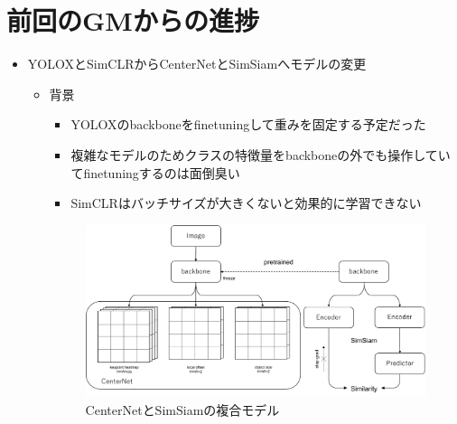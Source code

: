 \documentclass[a4j]{ujarticle}
\begin{document}
\clearpage

    \section{前回のGMからの進捗}
        \begin{itemize}
            \item YOLOX\cite{yolox}とSimCLR\cite{simclr}からCenterNet\cite{centernet}とSimSiam\cite{simsiam}へモデルの変更
            \begin{itemize}
                \item 背景
                \begin{itemize}
                    \item YOLOX\cite{yolox}のbackboneをfinetuningして重みを固定する予定だった
                    \item 複雑なモデルのためクラスの特徴量をbackboneの外でも操作していてfinetuningするのは面倒臭い
                    \item SimCLR\cite{simclr}はバッチサイズが大きくないと効果的に学習できない
                \end{itemize}

                \begin{figure}[h]
                    \includegraphics[width=.9\linewidth]{../fig/models.pdf}
                    \caption{CenterNet\cite{centernet}とSimSiam\cite{simsiam}の複合モデル}
                    \label{fig:models}
                \end{figure}


\end{itemize}
\end{itemize}
\end{document}
